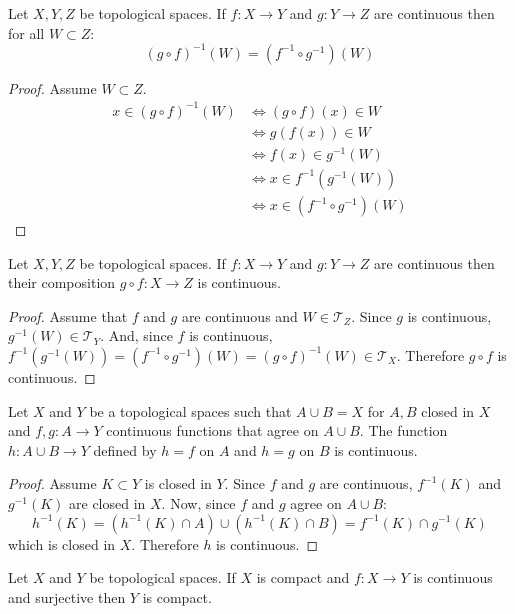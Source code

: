 \documentclass[letterpaper,12pt,fleqn]{article}
\newcommand{\T}{\mathscr{T}}
\begin{document}
\begin{lemma}
  Let \(X,Y,Z\) be topological spaces.  If \(f:X\to Y\) and \(g:Y\to Z\) are continuous then for all
  \(W\subset Z\):
  \[(g\circ f)^{-1}(W)=(f^{-1}\circ g^{-1})(W)\]
\end{lemma}

\begin{proof}
  Assume \(W\subset Z\).
  \begin{align*}
    x\in(g\circ f)^{-1}(W) &\iff (g\circ f)(x)\in W \\
    &\iff g(f(x))\in W \\
    &\iff f(x)\in g^{-1}(W) \\
    &\iff x\in f^{-1}(g^{-1}(W)) \\
    &\iff x\in (f^{-1}\circ g^{-1})(W)
  \end{align*}
\end{proof}

\begin{theorem}
  Let \(X,Y,Z\) be topological spaces.  If \(f:X\to Y\) and \(g:Y\to Z\) are continuous then their composition
  \(g\circ f:X\to Z\) is continuous.
\end{theorem}

\begin{proof}
  Assume that \(f\) and \(g\) are continuous and \(W\in\T_Z\).  Since \(g\) is continuous, \(g^{-1}(W)\in\T_Y\).
  And, since \(f\) is continuous, \(f^{-1}(g^{-1}(W))=(f^{-1}\circ g^{-1})(W)=(g\circ f)^{-1}(W)\in\T_X\).
  Therefore \(g\circ f\) is continuous.
\end{proof}

\begin{theorem}
  Let \(X\) and \(Y\) be a topological spaces such that \(A\cup B=X\) for \(A,B\) closed in \(X\) and \(f,g:A\to Y\)
  continuous functions that agree on \(A\cup B\).  The function \(h:A\cup B\to Y\) defined by \(h=f\) on \(A\) and
  \(h=g\) on \(B\) is continuous.
\end{theorem}

\begin{proof}
  Assume \(K\subset Y\) is closed in \(Y\).  Since \(f\) and \(g\) are continuous, \(f^{-1}(K)\) and \(g^{-1}(K)\)
  are closed in \(X\).  Now, since \(f\) and \(g\) agree on \(A\cup B\):
  \[h^{-1}(K)=(h^{-1}(K)\cap A)\cup(h^{-1}(K)\cap B)=f^{-1}(K)\cap g^{-1}(K)\]
  which is closed in \(X\).  Therefore \(h\) is continuous.
\end{proof}

\begin{theorem}
  Let \(X\) and \(Y\) be topological spaces.  If \(X\) is compact and \(f:X\to Y\) is continuous and surjective then
  \(Y\) is compact.
\end{theorem}
\end{document}
